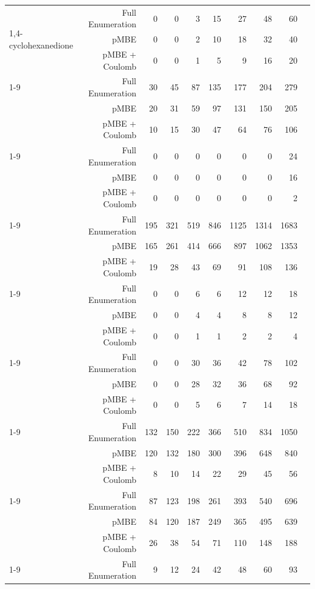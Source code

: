\begin{longtable}{lrrrrrrrrr}
\multirow[c]{3}{*}{1,4-cyclohexanedione} & Full Enumeration & 0 & 0 & 3 & 15 & 27 & 48 & 60 \\
 & pMBE & 0 & 0 & 2 & 10 & 18 & 32 & 40 \\
 & pMBE + Coulomb & 0 & 0 & 1 & 5 & 9 & 16 & 20 \\
\cline{1-9}
\multirow[c]{3}{*}{Acetic Acid} & Full Enumeration & 30 & 45 & 87 & 135 & 177 & 204 & 279 \\
 & pMBE & 20 & 31 & 59 & 97 & 131 & 150 & 205 \\
 & pMBE + Coulomb & 10 & 15 & 30 & 47 & 64 & 76 & 106 \\
\cline{1-9}
\multirow[c]{3}{*}{Adamantane} & Full Enumeration & 0 & 0 & 0 & 0 & 0 & 0 & 24 \\
 & pMBE & 0 & 0 & 0 & 0 & 0 & 0 & 16 \\
 & pMBE + Coulomb & 0 & 0 & 0 & 0 & 0 & 0 & 2 \\
\cline{1-9}
\multirow[c]{3}{*}{Ammonia} & Full Enumeration & 195 & 321 & 519 & 846 & 1125 & 1314 & 1683 \\
 & pMBE & 165 & 261 & 414 & 666 & 897 & 1062 & 1353 \\
 & pMBE + Coulomb & 19 & 28 & 43 & 69 & 91 & 108 & 136 \\
\cline{1-9}
\multirow[c]{3}{*}{Anthracene} & Full Enumeration & 0 & 0 & 6 & 6 & 12 & 12 & 18 \\
 & pMBE & 0 & 0 & 4 & 4 & 8 & 8 & 12 \\
 & pMBE + Coulomb & 0 & 0 & 1 & 1 & 2 & 2 & 4 \\
\cline{1-9}
\multirow[c]{3}{*}{Benzene} & Full Enumeration & 0 & 0 & 30 & 36 & 42 & 78 & 102 \\
 & pMBE & 0 & 0 & 28 & 32 & 36 & 68 & 92 \\
 & pMBE + Coulomb & 0 & 0 & 5 & 6 & 7 & 14 & 18 \\
\cline{1-9}
\multirow[c]{3}{*}{CO$_2$} & Full Enumeration & 132 & 150 & 222 & 366 & 510 & 834 & 1050 \\
 & pMBE & 120 & 132 & 180 & 300 & 396 & 648 & 840 \\
 & pMBE + Coulomb & 8 & 10 & 14 & 22 & 29 & 45 & 56 \\
\cline{1-9}
\multirow[c]{3}{*}{Cyanamide} & Full Enumeration & 87 & 123 & 198 & 261 & 393 & 540 & 696 \\
 & pMBE & 84 & 120 & 187 & 249 & 365 & 495 & 639 \\
 & pMBE + Coulomb & 26 & 38 & 54 & 71 & 110 & 148 & 188 \\
\cline{1-9}
\multirow[c]{3}{*}{Cytosine} & Full Enumeration & 9 & 12 & 24 & 42 & 48 & 60 & 93 \\

\end{longtable}

